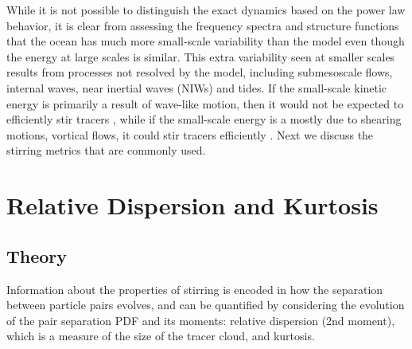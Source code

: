 \documentclass[]{ametsoc}
\begin{document}
While it is not possible to distinguish the exact dynamics based on the power law behavior, it is clear from assessing the frequency spectra and structure functions that the ocean has much more small-scale variability than the model even though the energy at large scales is similar. This extra variability seen at smaller scales results from processes not resolved by the model, including submesoscale flows, internal waves, near inertial waves (NIWs) and tides. If the small-scale kinetic energy is primarily a result of wave-like motion, then it would not be expected to efficiently stir tracers \citep{holmes2011particle}, while if the small-scale energy is a mostly due to shearing motions, vortical flows, it could stir tracers efficiently \citep{polzin2004isopycnal}. Next we discuss the stirring metrics that are commonly used.

\section{Relative Dispersion and Kurtosis}
\subsection{Theory} 
Information about the properties of stirring is encoded in how the separation between particle pairs evolves, and can be quantified by considering the evolution of the pair separation PDF and its moments: relative dispersion (2nd moment), which is a measure of the size of the tracer cloud, and kurtosis.
\end{document}
